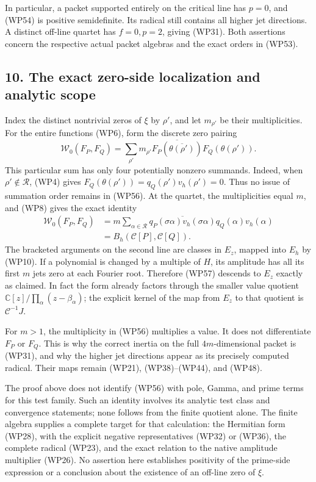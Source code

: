\documentclass[
  10pt,
  a4paper,
]{article}
\begin{document}
In particular, a packet supported entirely on the critical line has
\(p=0\), and (WP54) is positive semidefinite. Its radical still contains
all higher jet directions. A distinct off-line quartet has \(f=0,p=2\),
giving (WP31). Both assertions concern the respective actual packet
algebras and the exact orders in (WP53).

\subsection{10. The exact zero-side localization and analytic
scope}\label{the-exact-zero-side-localization-and-analytic-scope}

Index the distinct nontrivial zeros of \(\xi\) by \(\rho'\), and let
\(m_{\rho'}\) be their multiplicities. For the entire functions (WP6),
form the discrete zero pairing \[
\mathscr W_0(F_P,F_Q)
=\sum_{\rho'}m_{\rho'}
\overline{F_P(\overline{\theta(\rho')})}
F_Q(\theta(\rho')).
\tag{WP56}
\] This particular sum has only four potentially nonzero summands.
Indeed, when \(\rho'\notin\mathcal R\), (WP4) gives
\(F_Q(\theta(\rho'))=q_Q(\rho')v_h(\rho')=0\). Thus no issue of
summation order remains in (WP56). At the quartet, the multiplicities
equal \(m\), and (WP8) gives the exact identity \[
\begin{aligned}
\mathscr W_0(F_P,F_Q)
&=m\sum_{\alpha\in\mathcal R}
\overline{q_P(\sigma\alpha)v_h(\sigma\alpha)}
q_Q(\alpha)v_h(\alpha)\\
&=B_h(\mathcal C[P],\mathcal C[Q]).
\end{aligned}
\tag{WP57}
\] The bracketed arguments on the second line are classes in \(E_z\),
mapped into \(E_h\) by (WP10). If a polynomial is changed by a multiple
of \(H\), its amplitude has all its first \(m\) jets zero at each
Fourier root. Therefore (WP57) descends to \(E_z\) exactly as claimed.
In fact the form already factors through the smaller value quotient
\(\mathbb C[z]/\prod_\alpha(z-\beta_\alpha)\); the explicit kernel of
the map from \(E_z\) to that quotient is \(\mathcal C^{-1}J\).

For \(m>1\), the multiplicity in (WP56) multiplies a value. It does not
differentiate \(F_P\) or \(F_Q\). This is why the correct inertia on the
full \(4m\)-dimensional packet is (WP31), and why the higher jet
directions appear as its precisely computed radical. Their maps remain
(WP21), (WP38)--(WP44), and (WP48).

The proof above does not identify (WP56) with pole, Gamma, and prime
terms for this test family. Such an identity involves its analytic test
class and convergence statements; none follows from the finite quotient
alone. The finite algebra supplies a complete target for that
calculation: the Hermitian form (WP28), with the explicit negative
representatives (WP32) or (WP36), the complete radical (WP23), and the
exact relation to the native amplitude multiplier (WP26). No assertion
here establishes positivity of the prime-side expression or a conclusion
about the existence of an off-line zero of \(\xi\).
\end{document}
